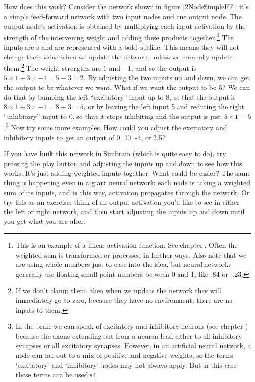 How does this work? Consider the network shown in figure \ref{2NodeSimpleFF}: it's a simple feed-forward network with two input nodes and one output node. The output node's activation is obtained by multiplying each input activation by the strength of the intervening weight and adding these products together.\footnote{This is an example of a linear activation function. See chapter . Often the weighted sum is transformed or processed in further ways. Also note that we are using whole numbers just to ease into the idea, but neural networks generally use floating small point numbers between 0 and 1, like .84 or -.23.}  The inputs are s and are represented with a bold outline. This means they will not change their value when we update the network, unless we manually update them.\footnote{If we don't clamp them, then when we update the network they will immediately go to zero, because they have no environment; there are no inputs to them.} The weight strengths are $1$ and $-1$, and so the output is $5 \times 1 + 3 \times -1 = 5 - 3 = 2$. By adjusting the two inputs up and down, we can get the output to be whatever we want. What if we want the output to be 5? We can do that by bumping the left  ``excitatory'' input up to 8, so that the output is $8 \times 1 + 3 \times -1 = 8 - 3 = 5$, or by leaving the left input 5 and reducing the right ``inhibitory'' input to 0, so that it stops inhibiting and the output is just $5 \times 1 = 5$.\footnote{In the brain we can speak of excitatory and inhibitory neurons (see chapter ) because the axons extending out from a neuron lead either to all inhibitory synapses or all excitatory synapses. However, in an artificial neural network, a node can fan-out to a mix of positive and negative weights, so the terms `excitatory' and `inhibitory' nodes may not always apply. But in this case those terms can be used.} Now try some more examples. How could you adjust the excitatory and inhibitory inputs to get an output of 0, 10, -4, or 2.5?

If you have built this network in Simbrain (which is quite easy to do), try pressing the play button and adjusting the inputs up and down to see how this works. It's just adding weighted inputs together. What could be easier? The same thing is happening even in a giant neural network: each node is taking a weighted sum of its inputs, and in this way, activation propagates through the network. Or try this as an exercise: think of an output activation you'd like to see in either the left or right network, and then start adjusting the inputs up and down until you get what you are after.

